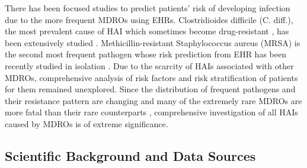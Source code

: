 There has been focused studies to predict patients' risk of developing infection due to the more frequent MDROs using EHRs. Clostridioides difficile (C. diff.), the most prevalent cause of HAI which sometimes become drug-resistant \cite{tenover2012antimicrobial, peng2017update, spigaglia2016recent}, has been extensively studied \cite{oh2018generalizable, wiens2012learning, wiens2014learning, wiens2012patient}.  Methicillin-resistant Staphylococcus aureus (MRSA) is the second most frequent pathogen whose risk prediction from EHR has been recently studied in isolation \cite{hartvigsen2018early, robicsek2011electronic}. Due to the scarcity of HAIs associated with other MDROs, comprehensive analysis of risk factors and risk stratification of patients for them remained unexplored. Since the distribution of frequent pathogens and their resistance pattern are changing \cite{weiner2016antimicrobial} and many of the extremely rare MDROs are more fatal than their rare counterparts \cite{resistance}, comprehensive investigation of all HAIs caused by MDROs is of extreme significance. 





\subsection{Scientific Background and Data Sources}

